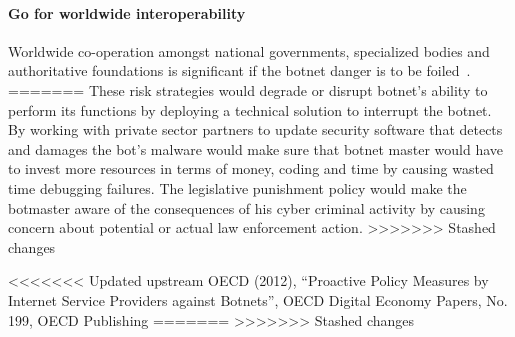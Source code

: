\paragraph{Go for worldwide interoperability}
Worldwide co-operation amongst national governments, specialized bodies and authoritative foundations is significant if the botnet danger is to be foiled~\cite{OECD}.
=======
These risk strategies would degrade or disrupt botnet's ability to perform its functions by deploying a technical solution to interrupt the botnet. By working with private sector partners to update security software that detects and damages the bot’s malware would make sure that botnet master would have to invest more resources in terms of money, coding and time by causing wasted time debugging failures. The legislative punishment policy would make the botmaster aware of the consequences of his cyber criminal activity by causing concern about potential or actual law enforcement action.
>>>>>>> Stashed changes



<<<<<<< Updated upstream
%
OECD (2012), “Proactive Policy Measures by Internet Service Providers against Botnets”, OECD Digital Economy Papers, No. 199, OECD Publishing
=======
>>>>>>> Stashed changes
